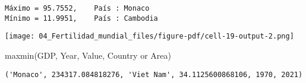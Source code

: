\documentclass[
  letterpaper,
  DIV=11,
  numbers=noendperiod]{scrreprt}
\newenvironment{Shaded}{\begin{snugshade}}{\end{snugshade}}
\newcommand{\NormalTok}[1]{\textcolor[rgb]{0.00,0.23,0.31}{#1}}
\newcommand{\StringTok}[1]{\textcolor[rgb]{0.13,0.47,0.30}{#1}}
\begin{document}
\begin{verbatim}
Máximo = 95.7552,    País : Monaco
Mínimo = 11.9951,    País : Cambodia
\end{verbatim}

\texttt{[image: 04\_Fertilidad\_mundial\_files/figure-pdf/cell-19-output-2.png]}

\begin{Shaded}
\begin{Highlighting}[]
\NormalTok{maxmin(GDP, }\StringTok{\textquotesingle{}Year\textquotesingle{}}\NormalTok{, }\StringTok{\textquotesingle{}Value\textquotesingle{}}\NormalTok{, }\StringTok{\textquotesingle{}Country or Area\textquotesingle{}}\NormalTok{)}
\end{Highlighting}
\end{Shaded}

\begin{verbatim}
('Monaco', 234317.084818276, 'Viet Nam', 34.1125600868106, 1970, 2021)
\end{verbatim}
\end{document}
